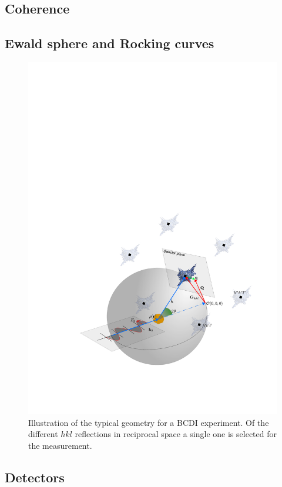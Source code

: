 \subsection{Coherence}

\subsection{Ewald sphere and Rocking curves}
\begin{figure}[H]
    \centering
    \includegraphics[width=\textwidth]{figures/Intro/ewald.pdf}
    \caption{Illustration of the typical geometry for a BCDI experiment. Of the different $hkl$ reflections in reciprocal 
    space a single one is selected for the measurement. }
    \label{fig:ewald}
\end{figure}



\subsection{Detectors}